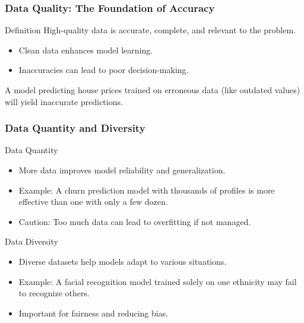 \documentclass[aspectratio=169]{beamer}
\begin{document}
\begin{frame}[fragile]
    \frametitle{Data Quality: The Foundation of Accuracy}
    \begin{block}{Definition}
        High-quality data is accurate, complete, and relevant to the problem.
    \end{block}
    \begin{itemize}
        \item Clean data enhances model learning.
        \item Inaccuracies can lead to poor decision-making.
    \end{itemize}
    \begin{example}
        A model predicting house prices trained on erroneous data (like outdated values) will yield inaccurate predictions.
    \end{example}
\end{frame}

\begin{frame}[fragile]
    \frametitle{Data Quantity and Diversity}
    \begin{block}{Data Quantity}
        \begin{itemize}
            \item More data improves model reliability and generalization.
            \item Example: A churn prediction model with thousands of profiles is more effective than one with only a few dozen.
            \item Caution: Too much data can lead to overfitting if not managed.
        \end{itemize}
    \end{block}
    
    \begin{block}{Data Diversity}
        \begin{itemize}
            \item Diverse datasets help models adapt to various situations.
            \item Example: A facial recognition model trained solely on one ethnicity may fail to recognize others.
            \item Important for fairness and reducing bias.
        \end{itemize}
    \end{block}
\end{frame}
\end{document}
